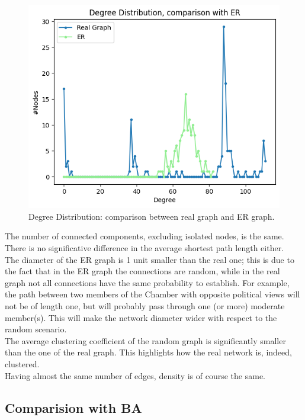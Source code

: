 \begin{figure}[h]
  \centering
  \includegraphics[width=\linewidth]{img/degree_dist_er_xvii.png}
  \caption{Degree Distribution: comparison between real graph and ER graph.}
  \label{fig:degree_er}
\end{figure}


The number of connected components, excluding isolated nodes, is the same. There is no significative difference in the average shortest path length either.\\
The diameter of the ER graph is 1 unit smaller than the real one; this is due to the fact that in the ER graph the connections are random, while in the real graph not all connections have the same probability to establish. For example, the path between two members of the Chamber with opposite political views will not be of length one, but will probably pass through one (or more) moderate member(s). This will make the network diameter wider with respect to the random scenario.\\

The average clustering coefficient of the random graph is significantly smaller than the one of the real graph. This highlights how the real network is, indeed, clustered.\\

Having almost the same number of edges, density is of course the same.


\subsection{Comparision with BA}

